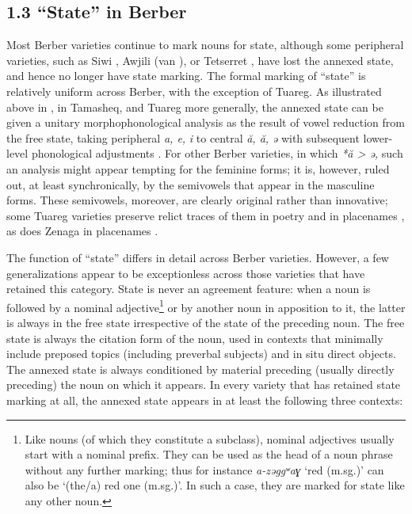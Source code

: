 \documentclass[output=paper]{langscibook}
\begin{document}
\subsection{1.3 “State” in Berber}
\begin{styleStandarduser}
Most Berber varieties continue to mark nouns for state, although some peripheral varieties, such as Siwi \citep{Souag2013}, Awjili (van \citealt{Putten2013}), or Tetserret \citep{Lux2013}, have lost the annexed state, and hence no longer have state marking. The formal marking of “state” is relatively uniform across Berber, with the exception of Tuareg. As illustrated above in , in Tamasheq, and Tuareg more generally, the annexed state can be given a unitary morphophonological analysis as the result of vowel reduction from the free state, taking peripheral \textit{a, e,} \textit{i} to central \textit{ă, ă,} \textit{ə} with subsequent lower-level phonological adjustments \citep[147]{Heath2005a}. For other Berber varieties, in which \textit{*ă > ə,} such an analysis might appear tempting for the feminine forms; it is, however, ruled out, at least synchronically, by the semivowels that appear in the masculine forms. These semivowels, moreover, are clearly original rather than innovative; some Tuareg varieties preserve relict traces of them in poetry and in placenames \citep{Brugnatelli1997}, as does Zenaga in placenames \citep{Taine-Cheikh2005}.
\end{styleStandarduser}

\begin{styleStandarduser}
The function of “state” differs in detail across Berber varieties. However, a few generalizations appear to be exceptionless across those varieties that have retained this category. State is never an agreement feature: when a noun is followed by a nominal adjective\footnote{Like nouns (of which they constitute a subclass), nominal adjectives usually start with a nominal prefix. They can be used as the head of a noun phrase without any further marking; thus for instance \textit{a-zəggʷaɣ} ‘red (m.sg.)’ can also be ‘(the/a) red one (m.sg.)’. In such a case, they are marked for state like any other noun.} or by another noun in apposition to it, the latter is always in the free state irrespective of the state of the preceding noun. The free state is always the citation form of the noun, used in contexts that minimally include preposed topics (including preverbal subjects) and in situ direct objects. The annexed state is always conditioned by material preceding (usually directly preceding) the noun on which it appears. In every variety that has retained state marking at all, the annexed state appears in at least the following three contexts:
\end{styleStandarduser}
\end{document}
